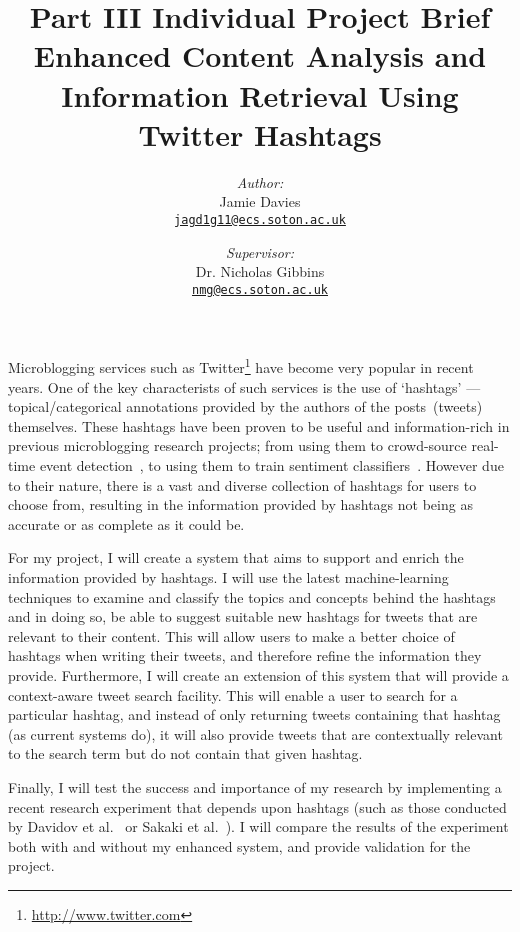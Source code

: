 \documentclass[a4paper,12pt]{article}
\title{
    \Large{Part III Individual Project Brief}\\[0.2cm]
    \huge{Enhanced Content Analysis and Information Retrieval Using Twitter Hashtags}
    \vspace*{-0.3cm}
}
\date{\vspace{-5ex}}
\author{
    \emph{Author:}\\
    Jamie Davies\\
    \href{mailto:jagd1g11@ecs.soton.ac.uk}{\nolinkurl{jagd1g11@ecs.soton.ac.uk}}
    \and
    \emph{Supervisor:}\\
    Dr. Nicholas Gibbins\\
    \href{mailto:nmg@ecs.soton.ac.uk}{\nolinkurl{nmg@ecs.soton.ac.uk}}
    \vspace*{-0.2cm}
}
\begin{document}

\maketitle
\vspace*{0.5cm}

Microblogging services such as Twitter\footnote{\url{http://www.twitter.com}} have become very popular in recent years. One of the key characterists of such services is the use of `hashtags' --- topical/categorical annotations provided by the authors of the posts~(tweets) themselves. These hashtags have been proven to be useful and information-rich in previous microblogging research projects; from using them to crowd-source real-time event detection~\cite{Sakaki:2010}, to using them to train sentiment classifiers~\cite{Davidov:2010}. However due to their nature, there is a vast and diverse collection of hashtags for users to choose from, resulting in the information provided by hashtags not being as accurate or as complete as it could be.

For my project, I will create a system that aims to support and enrich the information provided by hashtags. I will use the latest machine-learning techniques to examine and classify the topics and concepts behind the hashtags and in doing so, be able to suggest suitable new hashtags for tweets that are relevant to their content. This will allow users to make a better choice of hashtags when writing their tweets, and therefore refine the information they provide. Furthermore, I will create an extension of this system that will provide a context-aware tweet search facility. This will enable a user to search for a particular hashtag, and instead of only returning tweets containing that hashtag (as current systems do), it will also provide tweets that are contextually relevant to the search term but do not contain that given hashtag.

Finally, I will test the success and importance of my research by implementing a recent research experiment that depends upon hashtags (such as those conducted by Davidov et al.~\cite{Davidov:2010} or Sakaki et al.~\cite{Sakaki:2010}). I will compare the results of the experiment both with and without my enhanced system, and provide validation for the project.

\vspace*{-0.5cm}

{\footnotesize }
\end{document}
